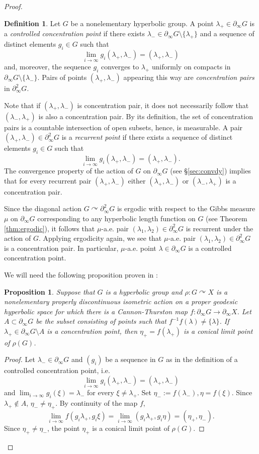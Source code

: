 \documentclass[12pt]{amsbook}%
\newtheorem{prop}[thm]{Proposition}
\theoremstyle{definition}
\newtheorem{defi}[thm]{Definition}
\theoremstyle{remark}
\numberwithin{section}{chapter}
\numberwithin{subsection}{section}
\numberwithin{figure}{chapter}
\DeclareMathOperator{\acts}{\curvearrowright}
\def\la{\lambda}
\def\geo{\partial_\infty}
\begin{document}
{{\begin{proof}
\begin{defi}
Let $G$ be a nonelementary hyperbolic group. A point $\la_+\in \geo G$ is  a {\em  controlled concentration point} 
 if there exists 
$\la_-\in \geo G\setminus \{\la_+\}$ and a sequence of distinct elements $g_i\in G$ such that 
$$
\lim_{i\to\infty} g_i(\la_+, \la_-)= (\la_+, \la_-) 
$$
and, moreover, the sequence $g_i$ converges to $\la_+$ uniformly on compacts in $\geo G\setminus \{\la_-\}$. Pairs of points $(\la_+, \la_-)$ appearing this way 
are {\em concentration pairs} in $\geo^2 G$. 
\end{defi}

Note that if $(\la_+, \la_-)$  is concentration pair, it does not necessarily follow that $(\la_-, \la_+)$  is also a concentration pair. By its definition, the set of concentration pairs is a countable intersection of open subsets, hence, is measurable. 
A pair 
$(\la_+, \la_-)\in \geo^2 G$ is a {\em recurrent point} if there exists a sequence of distinct elements $g_i\in G$ such that 
$$
\lim_{i\to\infty} g_i(\la_+, \la_-)= (\la_+, \la_-).  
$$
The convergence property of the action of $G$ on $\geo G$ (see \S \ref{sec:convdy}) 
implies that for every recurrent pair  $(\la_+, \la_-)$ either  $(\la_+, \la_-)$ or 
$(\la_-, \la_+)$  is a concentration pair. 

Since the diagonal action $G\acts \geo^2 G$ is ergodic with respect to the Gibbs measure $\mu$ on $\geo G$ 
corresponding to any hyperbolic length function on $G$ (see Theorem \ref{thm:ergodic}), it follows that 
$\mu$-a.e. pair $(\la_1, \la_2)\in \geo^2 G$ is recurrent under the action of $G$. Applying 
ergodicity again, we see that $\mu$-a.e. pair $(\la_1, \la_2)\in \geo^2 G$ is a concentration pair. 
In particular, $\mu$-a.e. point $\la\in \geo G$ is a controlled concentration point. 

We will need the following proposition proven in \cite[Proposition 7.5]{JKLO}:

\begin{prop}
Suppose that $G$ is a hyperbolic group and $\rho: G\acts X$ is a nonelementary properly discontinuous isometric action on a proper geodesic hyperbolic space for which there is a Cannon-Thurston map $f: \geo G\to \geo X$. Let $A\subset \geo G$ be the subset consisting of points such that $f^{-1} f(\la)\neq\{\la\}$. If $\la_+\in \geo G\setminus A$ is a concentration point, then $\eta_+=f(\la_+)$ is a conical limit point of $\rho(G)$. 
\end{prop}
\begin{proof} Let $\la_-\in \geo G$ and $(g_i)$ be a sequence in $G$ as in the definition of a controlled concentration point, i.e. 
$$
\lim_{i\to\infty} g_i(\la_+, \la_-)= (\la_+, \la_-) 
$$
and $\lim_{i\to\infty} g_i(\xi)=\la_-$ for every $\xi\ne \la_+$. 
Set $\eta_-:= f(\la_-), \eta=f(\xi)$. Since $\la_+\notin A$, $\eta_-\ne \eta_+$. By continuity of the map $f$,   
$$
\lim_{i\to\infty} f(g_i\la_+, g_i\xi) = \lim_{i\to\infty} (g_i\la_+, g_i\eta) = (\eta_+, \eta_-). 
$$
Since $\eta_+\ne \eta_-$, the point $\eta_+$ is a conical limit point of $\rho(G)$. 
\end{proof}


\end{proof}}}
\end{document}

